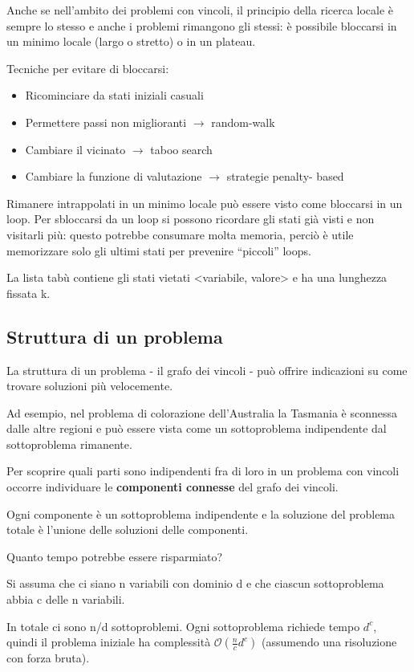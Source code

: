 Anche se nell'ambito dei problemi con vincoli, il principio della ricerca
locale è sempre lo stesso e anche i problemi rimangono gli stessi:
è possibile bloccarsi in un minimo locale (largo o stretto) o in un plateau.

Tecniche per evitare di bloccarsi:

\begin{itemize}
 \item Ricominciare da stati iniziali casuali
 \item Permettere passi non miglioranti $\rightarrow$ random-walk
 \item Cambiare il vicinato $\rightarrow$ taboo search
 \item Cambiare la funzione di valutazione $\rightarrow$ strategie penalty-
based
\end{itemize}

Rimanere intrappolati in un minimo locale può essere visto come bloccarsi
in un loop. Per sbloccarsi da un loop si possono ricordare gli stati
già visti e non visitarli più: questo potrebbe consumare molta memoria,
perciò è utile memorizzare solo gli ultimi stati per prevenire ``piccoli''
loops.

La lista tabù contiene gli stati vietati <variabile, valore> e ha una lunghezza
fissata k.

\subsection{Struttura di un problema}

La struttura di un problema - il grafo dei vincoli - può offrire indicazioni su
come trovare soluzioni più velocemente.

Ad esempio, nel problema di colorazione dell'Australia la Tasmania è sconnessa
dalle altre regioni e può essere vista come un sottoproblema indipendente dal
sottoproblema rimanente.

Per scoprire quali parti sono indipendenti fra di loro in un problema con
vincoli occorre individuare le \textbf{componenti connesse} del grafo dei
vincoli.

Ogni componente è un sottoproblema indipendente e la soluzione del problema
totale è l'unione delle soluzioni delle componenti.

Quanto tempo potrebbe essere risparmiato?

Si assuma che ci siano n variabili con dominio d e che ciascun sottoproblema
abbia c delle n variabili.

In totale ci sono n/d sottoproblemi. Ogni sottoproblema richiede tempo $d^c$,
quindi il problema iniziale ha complessità $\mathcal{O}(\frac{n}{c} d^c)$
(assumendo una risoluzione con forza bruta).

